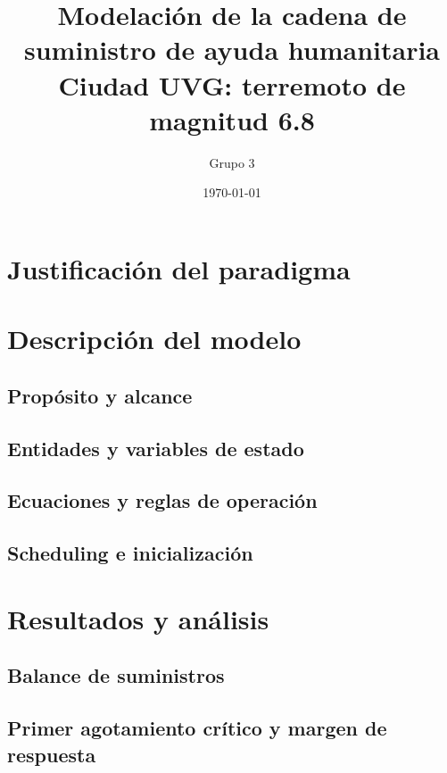 \documentclass[11pt,letterpaper]{article}
\title{Modelación de la cadena de suministro de ayuda humanitaria\\
\large Ciudad UVG: terremoto de magnitud 6.8}
\author{Grupo 3}
\date{\today}
\begin{document}
\maketitle

\section{Justificación del paradigma}

\section{Descripción del modelo}

\subsection{Propósito y alcance}

\subsection{Entidades y variables de estado}

\subsection{Ecuaciones y reglas de operación}

\subsection{Scheduling e inicialización}

\section{Resultados y análisis}

\subsection{Balance de suministros}

\subsection{Primer agotamiento crítico y margen de respuesta}
\end{document}
